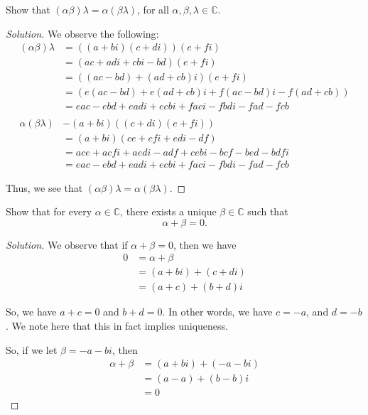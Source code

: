 \documentclass[openany]{book}
\newenvironment{solution}{\begin{proof}[Solution]}{\end{proof}}
\newcommand{\CC}{\mathbb{C}}
\begin{document}
	\begin{hw}
		Show that $(\alpha\beta)\lambda = \alpha(\beta\lambda)$, for all $\alpha,\beta,\lambda \in \CC$.
	\end{hw}
	\begin{solution}
		We observe the following:
		\begin{align*}
			(\alpha\beta) \lambda &= ( (a+bi)(c + di)) (e+fi) \\
			&= ( ac + adi + cbi - bd)(e + fi) \\
			&= ((ac - bd) + (ad + cb)i) (e + fi) \\
			&= ( e(ac - bd) + e(ad + cb)i + f(ac - bd)i - f(ad + cb)) \\
			&= eac - ebd + eadi + ecbi + faci - fbdi - fad - fcb \\
			\\
			\alpha(\beta\lambda) &- (a+bi) ((c + di)(e+fi)) \\
			&= (a+bi)(ce + cfi + edi - df) \\
			&= ace + acfi + aedi - adf + cebi - bcf - bed - bdfi \\
			&= eac - ebd + eadi + ecbi + faci - fbdi - fad - fcb
		\end{align*}
	
		Thus, we see that $(\alpha\beta)\lambda = \alpha(\beta\lambda)$.
	\end{solution}

	\begin{hw}
		Show that for every $\alpha \in \CC$, there exists a unique $\beta \in \CC$ such that
		\begin{equation*}
			\alpha + \beta = 0.
		\end{equation*}
	\end{hw}
	\begin{solution}
		We observe that if $\alpha + \beta = 0$, then we have
		\begin{align*}
			0 &= \alpha + \beta \\
			&= (a+bi) + (c+di) \\
			&= (a+c) + (b + d)i
		\end{align*}
		
		So, we have $a + c = 0$ and $b + d = 0$. In other words, we have $c = -a$, and $d = -b$. We note here that this in fact implies uniqueness.
		
		So, if we let $\beta = -a - bi$, then
		\begin{align*}
			\alpha + \beta &= (a+bi) + (-a - bi) \\
			&= (a-a) + (b - b)i \\
			&= 0
		\end{align*}
	\end{solution}
\end{document}
